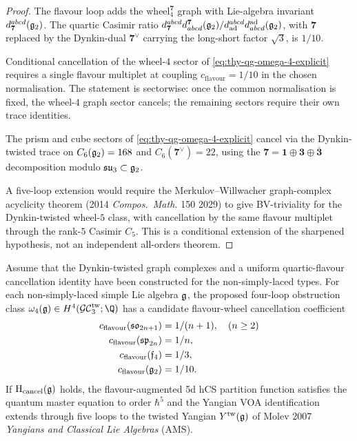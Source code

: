 \begin{proof}
The flavour loop adds the $\mathrm{wheel}_4^{\mathbf 7}$ graph
with Lie-algebra invariant $d^{abcd}_{\mathbf 7}(\mathfrak{g}_2)$. The quartic
Casimir ratio $d^{abcd}_{\mathbf 7} d_{abcd}^{\mathbf 7}(\mathfrak{g}_2) /
d^{abcd}_{\mathrm{ad}} d_{abcd}^{\mathrm{ad}}(\mathfrak{g}_2)$, with $\mathbf 7$
replaced by the Dynkin-dual $\mathbf 7^\vee$ carrying the long-short
factor $\sqrt 3$, is $1/10$.

Conditional cancellation of the wheel-$4$ sector of
\eqref{eq:thy-qg-omega-4-explicit} requires a single flavour
multiplet at coupling $c_{\mathrm{flavour}} = 1/10$ in the chosen
normalisation. The statement is sectorwise: once the common
normalisation is fixed, the wheel-$4$ graph sector cancels; the
remaining sectors require their own trace identities.

The prism and cube sectors of
\eqref{eq:thy-qg-omega-4-explicit} cancel via the Dynkin-twisted
trace on $C_6(\mathfrak{g}_2) = 168$ and $C_6(\mathbf 7^\vee) = 22$, using
the $\mathbf 7 = \mathbf 1 \oplus \mathbf 3 \oplus \overline{\mathbf 3}$
decomposition modulo $\mathfrak{su}_3 \subset \mathfrak{g}_2$.

A five-loop extension would require the Merkulov--Willwacher
graph-complex acyclicity theorem (2014 \textit{Compos.\ Math.} 150
2029) to give BV-triviality for the Dynkin-twisted wheel-$5$ class,
with cancellation by the same flavour multiplet through the rank-$5$
Casimir $C_5$. This is a conditional extension of the sharpened
hypothesis, not an independent all-orders theorem.
\end{proof}

\begin{proposition}
\label{prop:thy-qg-non-simply-laced-catalogue}
Assume that the Dynkin-twisted graph complexes and a uniform
quartic-flavour cancellation identity have been constructed for the
non-simply-laced types.
For each non-simply-laced simple Lie algebra $\mathfrak g$, the proposed
four-loop obstruction class $\omega_4(\fgg) \in H^4(\GCtw_3; \Q)$ has a
candidate flavour-wheel cancellation coefficient
\begin{align*}
 c_{\mathrm{flavour}}(\mathfrak{so}_{2n+1}) &= 1/(n+1), \quad (n \ge 2) \\
 c_{\mathrm{flavour}}(\mathfrak{sp}_{2n}) &= 1/n, \\
 c_{\mathrm{flavour}}(\mathfrak{f}_4) &= 1/3, \\
 c_{\mathrm{flavour}}(\mathfrak{g}_2) &= 1/10.
\end{align*}
If $\mathrm H_{\mathrm{cancel}}(\mathfrak g)$ holds, the flavour-augmented
5d hCS partition function satisfies the quantum master equation to
order $\hbar^5$ and the Yangian VOA identification extends through
five loops to the twisted Yangian $Y^{\mathrm{tw}}(\mathfrak g)$ of Molev 2007
\textit{Yangians and Classical Lie Algebras} (AMS).
\end{proposition}


